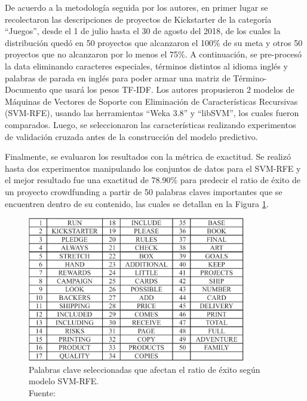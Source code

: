 De acuerdo a la metodología seguida por los autores, en primer lugar se recolectaron las descripciones de proyectos de Kickstarter de la categoría “Juegos”, desde el 1 de julio hasta el 30 de agosto del 2018, de los cuales la distribución quedó en 50 proyectos que alcanzaron el 100\% de su meta y otros 50 proyectos que no alcanzaron por lo menos el 75\%. A continuación, se pre-procesó la data eliminando caracteres especiales, términos distintos al idioma inglés y palabras de parada en inglés para poder armar una matriz de Término-Documento que usará los pesos TF-IDF. Los autores propusieron 2 modelos de Máquinas de Vectores de Soporte con Eliminación de Características Recursivas (SVM-RFE), usando las herramientas “Weka 3.8” y “libSVM”, los cuales fueron comparados. Luego, se seleccionaron las características realizando experimentos de validación cruzada antes de la construcción del modelo predictivo. 

Finalmente, se evaluaron los resultados con la métrica de exactitud.
Se realizó hasta dos experimentos manipulando los conjuntos de datos para el SVM-RFE y el mejor resultado fue una exactitud de 78.90\% para predecir el ratio de éxito de un proyecto crowdfunding a partir de 50 palabras claves importantes que se encuentren dentro de su contenido, las cuales se detallan en la Figura \ref{2:fig126}.

\begin{figure}[!ht]
	\begin{center}
		\includegraphics[width=0.85\textwidth]{2/figures/chen2019.jpg}
		\caption[Palabras clave seleccionadas que afectan el ratio de éxito según modelo SVM-RFE]{Palabras clave seleccionadas que afectan el ratio de éxito según modelo SVM-RFE.\\
			Fuente: \cite{pr_chen2019keywords_crowdfunding}}
		\label{2:fig126}
	\end{center}
\end{figure}

